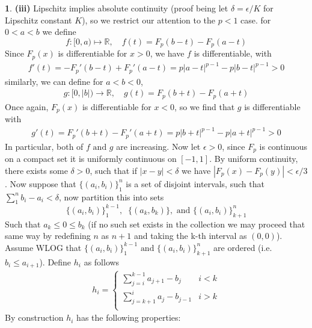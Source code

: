 \documentclass[10.5pt]{article}
\theoremstyle{definition}
\newtheorem{pb}{}
\newcommand{\set}[1]{\{#1\}}
\newcommand{\abs}[1]{\left\vert#1\right\vert}
\newcommand{\tand}{\text{ and }}
\begin{document}
\begin{pb}
        \textbf{(iii)} Lipschitz implies absolute continuity (proof being let \(\delta = \epsilon/K\) for Lipschitz constant \(K\)), so we restrict our attention to the \(p < 1\) case.
        for \(0 < a < b\) we define \[f: [0,a) \mapsto \mathbb{R}, \quad f(t) = F_p(b - t) - F_p(a - t)\]
        Since \(F_p(x)\) is differentiable for \(x > 0\), we have \(f\) is differentiable, with
        \begin{align*}
            f'(t) = -F_p'(b-t) + F_p'(a-t) = p\abs{a-t}^{p-1} - p\abs{b-t}^{p-1} > 0
        \end{align*}
        similarly, we can define for \(a < b < 0\),
        \begin{align*}
            g: [0,\abs{b}) \to \mathbb{R}, \quad g(t) = F_p(b + t) - F_p(a + t)
        \end{align*}
        Once again, \(F_p(x)\) is differentiable for \(x < 0\), so we find that \(g\) is differentiable with
        \begin{align*}
            g'(t) = F_p'(b+t) - F_p'(a+t) = p\abs{b + t}^{p-1} - p\abs{a + t}^{p-1} > 0 
        \end{align*}
        In particular, both of \(f \tand g\) are increasing. Now let \(\epsilon > 0\), since \(F_p\) is continuous on a compact set it is uniformly continuous on \([-1,1]\). By uniform continuity, there exists some \(\delta > 0\), such that if \(\abs{x - y} < \delta\) we have \(\abs{F_p(x) - F_p(y)} < \epsilon/3\). Now suppose that \(\set{(a_i,b_i)}_1^n\) is a set of disjoint intervals, such that \(\sum_1^n b_i - a_i < \delta\), now partition this into sets
        \[\set{(a_i,b_i)}_1^{k-1}, \;\; \set{(a_k,b_k)}, \tand \set{(a_i,b_i)}_{k+1}^n\]
        Such that \(a_k \leq 0 \leq b_k\) (if no such set exists in the collection we may proceed that same way by redefining \(n\) as \(n+1\) and taking the k-th interval as \((0,0)\)). Assume WLOG that \(\set{(a_i,b_i)}_1^{k-1} \tand \set{(a_i,b_i)}_{k+1}^n\) are ordered (i.e. \(b_i \leq a_{i+1}\)). Define \(h_i\) as follows
        \begin{align*}
            h_i = \begin{cases}
                \sum_{j = i}^{k-1} a_{j+1} - b_j & i < k \\
                \sum_{j=k+1}^i a_j - b_{j-1} & i > k \\
            \end{cases}
        \end{align*}
        By construction \(h_i\) has the following properties:
        \begin{align*}

\end{align*}
\end{pb}
\end{document}

